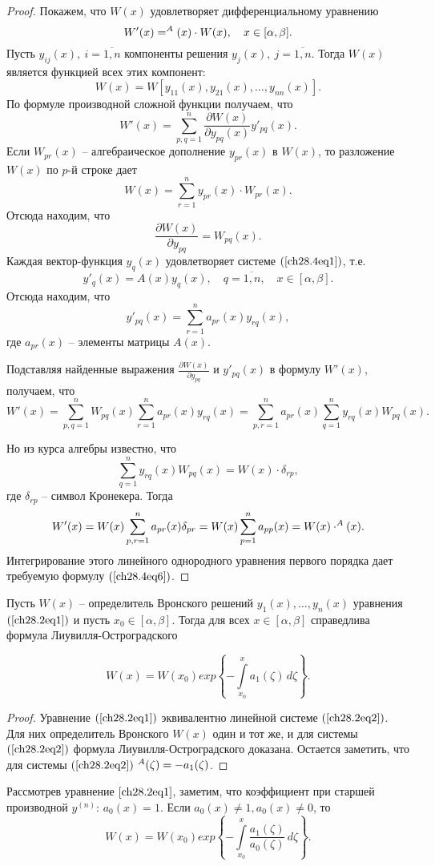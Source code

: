 \begin{proof}
Покажем, что $W(x)$ удовлетворяет дифференциальному уравнению
$$
W'(x) = \sp A(x) \cdot W(x), \quad x \in [\alpha, \beta].
$$
Пусть $y_{ij}(x),\ i = \overline{1,n}$ компоненты решения $y_j(x),\ j = \overline{1,n}$. Тогда $W(x)$ является функцией всех этих компонент:
$$
W(x) = W[y_{11}(x), y_{21}(x), \ldots, y_{nn}(x)].
$$
По формуле производной сложной функции получаем, что 
$$
W'(x) = \sum\limits_{p,q = 1}^{n} \frac{\partial W(x)}{\partial y_{pq}(x)} y'_{pq}(x).
$$
Если $W_{pr}(x)$ -- алгебраическое дополнение $y_{pr}(x)$ в $W(x)$, то разложение $W(x)$ по $p$-й строке дает
$$
W(x) = \sum\limits_{r = 1}^{n} y_{pr}(x) \cdot W_{pr}(x).
$$
Отсюда находим, что 
$$
\frac{\partial W(x)}{\partial y_{pq}} = W_{pq}(x).
$$
Каждая вектор-функция $y_q(x)$ удовлетворяет системе $(\ref{ch28.4eq1})$, т.е.
$$
y'_q(x) = A(x)y_q(x), \quad q = \overline{1,n}, \quad x \in [\alpha, \beta].
$$
Отсюда находим, что 
$$
y'_{pq}(x) = \sum\limits_{r = 1}^{n} a_{pr}(x)y_{rq}(x),
$$
где $a_{pr}(x)$ -- элементы матрицы $A(x)$.

Подставляя найденные выражения $\frac{\partial W(x)}{\partial y_{pq}}$ и $y'_{pq}(x)$ в формулу $W'(x)$, получаем, что
$$
W'(x) = \sum\limits_{p,q = 1}^{n} W_{pq}(x) \sum\limits_{r = 1}^{n} a_{pr}(x)y_{rq}(x) = \sum\limits_{p,r = 1}^{n} a_{pr}(x) \sum\limits_{q = 1}^{n} y_{rq}(x) W_{pq}(x).
$$

Но из курса алгебры известно, что 
$$
\sum\limits_{q = 1}^{n}y_{rq}(x) W_{pq}(x) = W(x) \cdot \delta_{rp},
$$
где $\delta_{rp}$ -- символ Кронекера. Тогда
$$
W'(x) = W(x) \sum\limits_{p,r = 1}^{n} a_{pr}(x) \delta_{pr} = W(x) \sum\limits_{p = 1}^{n} a_{pp}(x) = W(x) \cdot \sp A(x).
$$
Интегрирование этого линейного однородного уравнения первого порядка дает требуемую формулу $(\ref{ch28.4eq6})$.
\end{proof}

\begin{thm}
Пусть $W(x)$ -- определитель Вронского решений $y_1(x), \ldots, y_n(x)$ уравнения $(\ref{ch28.2eq1})$ и пусть $x_0 \in [\alpha, \beta]$. Тогда для всех $x \in [\alpha, \beta]$ справедлива формула Лиувилля-Остроградского

$$
W(x) = W(x_0) exp \left\lbrace - \int\limits_{x_0}^{x} a_1(\zeta) \,d\zeta \right\rbrace.
$$
\end{thm}

\begin{proof}
Уравнение $(\ref{ch28.2eq1})$ эквивалентно линейной системе $(\ref{ch28.2eq2})$. Для них определитель Вронского $W(x)$ один и тот же, и для системы $(\ref{ch28.2eq2})$ формула Лиувилля-Остроградского доказана. Остается заметить, что для системы $(\ref{ch28.2eq2})$ $\sp A(\zeta) = - a_1(\zeta)$.
\end{proof}

\begin{notion}
Рассмотрев уравнение $\eqref{ch28.2eq1}$, заметим, что коэффициент при старшей производной $y^{(n)}$:  $a_0(x) = 1$. Если $a_0(x) \not= 1, a_0(x) \not= 0$, то 
$$
W(x) = W(x_0) exp \left\lbrace - \int\limits_{x_0}^{x} \frac{a_1(\zeta)}{a_0(\zeta)} \,d\zeta \right\rbrace.
$$
\end{notion}